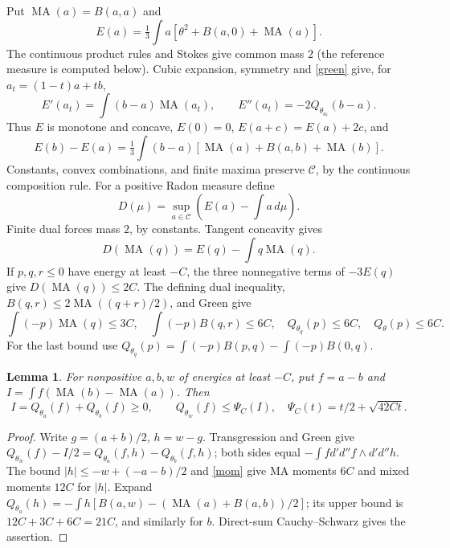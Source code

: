 \documentclass[11pt]{article}
\newtheorem{lemma}[theorem]{Lemma}
\newcommand{\DD}{d'd''}
\newcommand{\MA}{\operatorname{MA}}
\newcommand{\C}{\mathcal C}
\begin{document}
Put $\MA(a)=B(a,a)$ and
\[
 E(a)=\tfrac13\int a[\theta^2+B(a,0)+\MA(a)].
\]
The continuous product rules and Stokes give common mass $2$ (the
reference measure is computed below). Cubic expansion, symmetry and
\eqref{green} give, for $a_t=(1-t)a+tb$,
\begin{equation}\label{var}
 E'(a_t)=\int(b-a)\MA(a_t),\qquad
 E''(a_t)=-2Q_{\theta_{a_t}}(b-a).
\end{equation}
Thus $E$ is monotone and concave, $E(0)=0$, $E(a+c)=E(a)+2c$, and
\begin{equation}\label{cocycle}
 E(b)-E(a)=\tfrac13\int(b-a)[\MA(a)+B(a,b)+\MA(b)].
\end{equation}
Constants, convex combinations, and finite maxima preserve $\C$,
by the continuous composition rule. For a positive Radon measure define
\[
 D(\mu)=\sup_{a\in\C}\left(E(a)-\int a\,d\mu\right).
\]
Finite dual forces mass $2$, by constants. Tangent concavity gives
\begin{equation}\label{tangent}
 D(\MA(q))=E(q)-\int q\MA(q).
\end{equation}
If $p,q,r\le0$ have energy at least $-C$, the three nonnegative terms
of $-3E(q)$ give $D(\MA(q))\le2C$. The defining dual inequality,
$B(q,r)\le2\MA((q+r)/2)$, and Green give
\begin{equation}\label{mom}
 \int(-p)\MA(q)\le3C,\quad \int(-p)B(q,r)\le6C,
 \quad Q_{\theta_q}(p)\le6C,\quad Q_\theta(p)\le6C.
\end{equation}
For the last bound use
$Q_{\theta_q}(p)=\int(-p)B(p,q)-\int(-p)B(0,q)$.

\begin{lemma}\label{alltest}
For nonpositive $a,b,w$ of energies at least $-C$, put $f=a-b$ and
$I=\int f(\MA(b)-\MA(a))$. Then
\[
 I=Q_{\theta_a}(f)+Q_{\theta_b}(f)\ge0,\qquad
 Q_{\theta_w}(f)\le\Psi_C(I),\quad \Psi_C(t)=t/2+\sqrt{42Ct}.
\]
\end{lemma}
\begin{proof}
Write $g=(a+b)/2$, $h=w-g$. Transgression and Green give
$Q_{\theta_w}(f)-I/2=Q_{\theta_a}(f,h)-Q_{\theta_b}(f,h)$;
both sides equal $-\int f\DD f\wedge\DD h$.
The bound $|h|\le-w+(-a-b)/2$ and \eqref{mom} give MA moments
$6C$ and mixed moments $12C$ for $|h|$. Expand
$Q_{\theta_a}(h)=-\int h[B(a,w)-(\MA(a)+B(a,b))/2]$;
its upper bound is $12C+3C+6C=21C$, and similarly for $b$.
Direct-sum Cauchy--Schwarz gives the assertion.
\end{proof}
\end{document}
